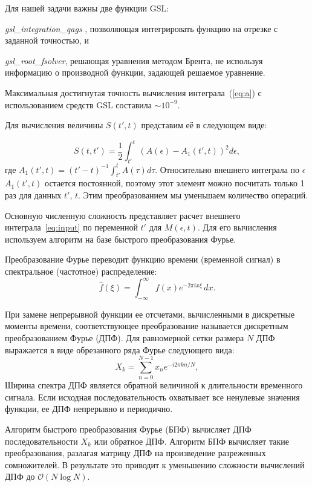 \documentclass[14pt, a4paper]{article}
\numberwithin{figure}{section}
\numberwithin{equation}{section}
\begin{document}
Для нашей задачи важны две функции GSL: 

\textit{gsl\_integration\_qags} \cite{gsl:website2}, позволяющая интегрировать функцию на отрезке с заданной точностью, и 

\textit{gsl\_root\_fsolver}, решающая уравнения методом Брента, не используя информацию о производной функции, задающей решаемое уравнение\cite{gsl:website2}.

Максимальная достигнутая точность вычисления интеграла~(\ref{eq:a}) с использованием средств GSL составила $\sim 10^{-9}$.

Для вычисления величины $S(t', t)$ представим её в следующем  виде:

\begin{equation}\label{eq:s_integrate2}
S(t, t') = \frac{1}{2}\int_{t'}^{t} \left( A(\epsilon) - A_1(t', t) \right)^2 d\epsilon,
\end{equation}
где $A_1(t', t) = (t'-t)^{-1}\int_{t'}^{t}A(\tau) d\tau$. Относительно внешнего интеграла по $\epsilon$ $A_1(t', t)$ остается постоянной, поэтому этот элемент можно посчитать только 1 раз для данных $t'$, $t$. Этим преобразованием мы уменьшаем количество операций. 

Основную численную сложность представляет расчет внешнего интеграла~\ref{eq:input} по переменной $t'$ для $M(\epsilon,t)$. 
Для его вычисления используем алгоритм на базе быстрого преобразования Фурье.

Преобразование Фурье переводит функцию времени (временной сигнал) в спектральное (частотное) распределение:
\begin{equation}
\label{int:Fourier}
\hat{f}(\xi) =\int_{-\infty}^{\infty}f(x)e^{-2\pi ix\xi }\,dx.
\end{equation}

При замене непрерывной функции ее отсчетами, вычисленными в дискретные моменты времени, соответствующее преобразование называется дискретным преобразованием Фурье (ДПФ). Для равномерной сетки размера $N$ ДПФ выражается в виде обрезанного ряда Фурье следующего вида:
\begin{equation}
\label{DFT}
X_{k}=\sum_{n=0}^{N-1} x_{n} e^{-i2\pi kn/N},
\end{equation}
Ширина спектра ДПФ является обратной величиной к длительности временного сигнала. Если исходная последовательность охватывает все ненулевые значения функции, ее ДПФ непрерывно и периодично.

Алгоритм быстрого преобразования Фурье (БПФ) вычисляет ДПФ последовательности $X_k$ или обратное ДПФ. Алгоритм БПФ вычисляет такие преобразования, разлагая матрицу ДПФ на произведение разреженных сомножителей. В результате это приводит к уменьшению сложности вычислений ДПФ до $\mathcal{O}(N\log N)$.
\end{document}
